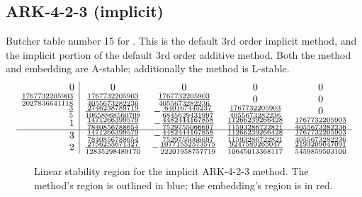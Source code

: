 \documentclass[letterpaper,10pt,english]{sphinxmanual}
\begin{document}
\subsection{ARK-4-2-3 (implicit)}
\label{Butcher:ark-4-2-3-implicit}\label{Butcher:butcher-ark-4-2-3-i}
Butcher table number 15
for {\hyperref[c_interface/User_callable:c.ARKodeSetIRKTableNum]{\emph{}}}.  This is
the default 3rd order implicit method, and the implicit portion of the
default 3rd order additive method.  Both the method and embedding are
A-stable; additionally the method is L-stable.
\begin{gather}
\begin{split}\begin{array}{r|cccc}
  0 & 0 & 0 & 0 & 0 \\
  \frac{1767732205903}{2027836641118} & \frac{1767732205903}{4055673282236} & \frac{1767732205903}{4055673282236} & 0 & 0 \\
  \frac{3}{5} & \frac{2746238789719}{10658868560708} & -\frac{640167445237}{6845629431997} & \frac{1767732205903}{4055673282236} & 0 \\
  1 & \frac{1471266399579}{7840856788654} & -\frac{4482444167858}{7529755066697} & \frac{11266239266428}{11593286722821} & \frac{1767732205903}{4055673282236} \\
  \hline
  3 & \frac{1471266399579}{7840856788654} & -\frac{4482444167858}{7529755066697} & \frac{11266239266428}{11593286722821} & \frac{1767732205903}{4055673282236} \\
  2 & \frac{2756255671327}{12835298489170} & -\frac{10771552573575}{22201958757719} & \frac{9247589265047}{10645013368117} & \frac{2193209047091}{5459859503100}
\end{array}\end{split}\notag
\end{gather}\begin{figure}[htbp]
\centering
\capstart

\caption{Linear stability region for the implicit ARK-4-2-3 method.  The method's
region is outlined in blue; the embedding's region is in red.}\end{figure}
\end{document}
